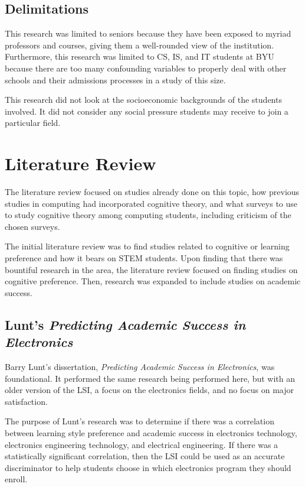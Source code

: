 \subsection{Delimitations}
This research was limited to seniors because they have been exposed to myriad professors and courses, giving them a well-rounded view of the institution. Furthermore, this research was limited to CS, IS, and IT students at BYU because there are too many confounding variables to properly deal with other schools and their admissions processes in a study of this size.

This research did not look at the socioeconomic backgrounds of the students involved. It did not consider any social pressure students may receive to join a particular field.

\section{Literature Review}
The literature review focused on studies already done on this topic, how previous studies in computing had incorporated cognitive theory, and what surveys to use to study cognitive theory among computing students, including criticism of the chosen surveys.

The initial literature review was to find studies related to cognitive or learning preference and how it bears on STEM students. Upon finding that there was bountiful research in the area, the literature review focused on finding studies on cognitive preference. Then, research was expanded to include studies on academic success.

\subsection{Lunt's \textit{Predicting Academic Success in Electronics}}
Barry Lunt's dissertation, \textit{Predicting Academic Success in Electronics}, was foundational. It performed the same research being performed here, but with an older version of the LSI, a focus on the electronics fields, and no focus on major satisfaction.

The purpose of Lunt's research was to determine if there was a correlation between learning style preference and academic success in electronics technology, electronics engineering technology, and electrical engineering. If there was a statistically significant correlation, then the LSI could be used as an accurate discriminator to help students choose in which electronics program they should enroll.

